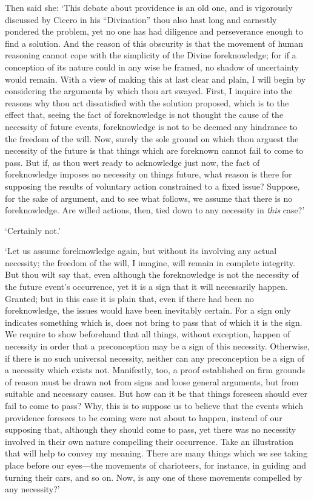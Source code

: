\documentclass[11pt]{book}
\begin{document}
Then said she: `This debate about providence is an old one, and is
vigorously discussed by Cicero in his ``Divination'' thou also hast long
and earnestly pondered the problem, yet no one has had diligence and
perseverance enough to find a solution. And the reason of this obscurity
is that the movement of human reasoning cannot cope with the simplicity
of the Divine foreknowledge; for if a conception of its nature could in
any wise be framed, no shadow of uncertainty would remain. With a view
of making this at last clear and plain, I will begin by considering the
arguments by which thou art swayed. First, I inquire into the reasons
why thou art dissatisfied with the solution proposed, which is to the
effect that, seeing the fact of foreknowledge is not thought the cause
of the necessity of future events, foreknowledge is not to be deemed any
hindrance to the freedom of the will. Now, surely the sole ground on
which thou arguest the necessity of the future is that things which are
foreknown cannot fail to come to pass. But if, as thou wert ready to
acknowledge just now, the fact of foreknowledge imposes no necessity on
things future, what reason is there for supposing the results of
voluntary action constrained to a fixed issue? Suppose, for the sake of
argument, and to see what follows, we assume that there is no
foreknowledge. Are willed actions, then, tied down to any necessity in
\emph{this} case?'

`Certainly not.'

`Let us assume foreknowledge again, but without its involving any actual
necessity; the freedom of the will, I imagine, will remain in complete
integrity. But thou wilt say that, even although the foreknowledge is
not the necessity of the future event's occurrence, yet it is a sign
that it will necessarily happen. Granted; but in this case it is plain
that, even if there had been no foreknowledge, the issues would have
been inevitably certain. For a sign only indicates something which is,
does not bring to pass that of which it is the sign. We require to show
beforehand that all things, without exception, happen of necessity in
order that a preconception may be a sign of this necessity. Otherwise,
if there is no such universal necessity, neither can any preconception
be a sign of a necessity which exists not. Manifestly, too, a proof
established on firm grounds of reason must be drawn not from signs and
loose general arguments, but from suitable and necessary causes. But how
can it be that things foreseen should ever fail to come to pass? Why,
this is to suppose us to believe that the events which providence
foresees to be coming were not about to happen, instead of our supposing
that, although they should come to pass, yet there was no necessity
involved in their own nature compelling their occurrence. Take an
illustration that will help to convey my meaning. There are many things
which we see taking place before our eyes---the movements of charioteers,
for instance, in guiding and turning their cars, and so on. Now, is any
one of these movements compelled by any necessity?'
\end{document}
